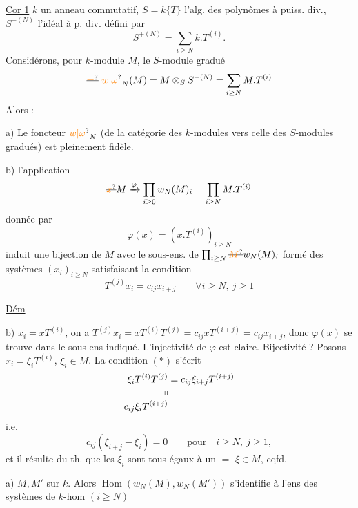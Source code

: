 \uline{Cor 1}  $k$ un anneau commutatif, $S=k\{T\}$ l'alg. des polynômes à puiss. div.,   $S^{+(N)}$ l'idéal à p. div.  défini par
\[
S^{+(N)}=\sum_{i\geq N}k.T^{(i)}.
\]
 Considérons, pour   $k$-module $M$, le $S$-module gradué
\[
\deleted{\unsure{=}}\ \unsure{w|\omega}_N(M)=M\otimes_S S^{+(N)}=\sum_{i\geq N}M.T^{(i)}
\]
Alors :

a) Le foncteur $\unsure{w|\omega}_N$ (de la catégorie des $k$-modules vers celle des $S$-modules gradués) est pleinement fidèle.

b)  l'application
\[
\deleted{\unsure{x}}M\xrightarrow{\varphi}\prod_{i\geq0}w_N(M)_i=\prod_{i\geq N}M.T^{(i)}
\]
donnée par
\[
\varphi(x)=(x.T^{(i)})_{i\geq N}
\]
induit une bijection de $M$ avec le sous-ens. de $\prod_{i\geq N}\deleted{\unsure{M}}w_N(M)_i$ formé des systèmes $(x_i)_{i\geq N}$ satisfaisant la condition
\[
T^{(j)}x_i=c_{ij}x_{i+j}\qquad\forall i\geq N,\ j\geq1\tag*{$(*)$}
\]

\uline{Dém}

b) $x_i=xT^{(i)}$, on a $T^{(j)}x_i=xT^{(i)}T^{(j)}=c_{ij}xT^{(i+j)}=c_{ij}x_{i+j}$, donc $\varphi(x)$ se trouve dans le sous-ens indiqué. L'injectivité de $\varphi$ est claire. Bijectivité ? Posons $x_i=\xi_i T^{(i)}$, $\xi_i\in M$. La condition $(*)$ s'écrit
\[
\begin{aligned}
\xi_i T^{(i)}T^{(j)}&=c_{ij}\xi_{i+j}T^{(i+j)}\\[-2pt]
\shortparallel&\\[-2pt]
c_{ij}\xi_iT^{(i+j)}&
\end{aligned}
\]
i.e.
\[
c_{ij}(\xi_{i+j}-\xi_i)=0\qquad\text{pour}\quad i\geq N,\ j\geq1,
\]
et il résulte du th. que les $\xi_i$ sont tous égaux à un $=$ $\xi\in M$, cqfd.

a)  $M,M'$ sur $k$. Alors $\operatorname{Hom}(w_N(M),w_N(M'))$ s'identifie à l'ens des systèmes de $k$-hom $(i\geq N)$

